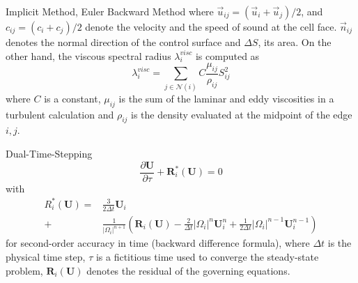 \begin{frame}[allowframebreaks]{Implicit Method, Euler Backward Method}
where $\vec{u}_{i j}=\left(\vec{u}_{i}+\vec{u}_{j}\right) / 2$, and $c_{i j}=\left(c_{i}+c_{j}\right) / 2$ denote the velocity and the speed of sound at the cell face.
$\vec{n}_{i j}$ denotes the normal direction of the control surface and $\Delta S$, its area. On the other hand, the viscous
spectral radius $\lambda_{i}^{v i s c}$ is computed as
\begin{equation}
\lambda_{i}^{v i s c}=\sum_{j \in \mathcal{N}(i)} C \frac{\mu_{i j}}{\rho_{i j}} S_{i j}^{2}
\end{equation}
where $C$ is a constant, $\mu_{i j}$ is the sum of the laminar and eddy viscosities in a turbulent calculation and $\rho_{i j}$
is the density evaluated at the midpoint of the edge ${i,j}$.

\end{frame}

\begin{frame}[allowframebreaks]{Dual-Time-Stepping}
\begin{equation}
\frac{\partial \boldsymbol{U}}{\partial \tau}+\boldsymbol{R}_{i}^{*}(\boldsymbol{U})=0
\end{equation}
with
\begin{equation}
\begin{aligned} R_{i}^{*}(\boldsymbol{U})=& \frac{3}{2 \Delta t} \boldsymbol{U}_{i} \\+& \frac{1}{\left|\Omega_{i}\right|^{n+1}}\left(\boldsymbol{R}_{i}(\boldsymbol{U})-\frac{2}{\Delta t}\left|\Omega_{i}\right|^{n} \boldsymbol{U}_{i}^{n}+\frac{1}{2 \Delta t}\left|\Omega_{i}\right|^{n-1} \boldsymbol{U}_{i}^{n-1}\right) \end{aligned}
\end{equation}
for second-order accuracy in time (backward difference formula),
where $\Delta t$ is the physical time step, $\tau$ is a fictitious time used to
converge the steady-state problem, $\boldsymbol{R}_i(\boldsymbol{U})$ denotes the residual of the
governing equations.

\end{frame}